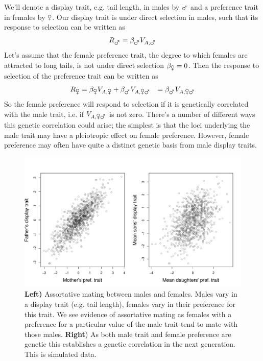 We'll denote a display trait, e.g. tail length, in males by $\mars$ and a preference
trait in females by $\venus$. Our display trait is under direct selection in males, such that its response to selection can be written as
\begin{equation}
R_{\mars} = \beta_{\mars} V_{A, \mars}
\end{equation}
Let's assume that the female preference trait, the degree to which
females are attracted to long tails, is not under direct
selection $\beta_{\venus}=0$. Then the response to selection of the
preference trait can be written as
\begin{eqnarray}
R_{\venus} &=\beta_{\venus}V_{A,\venus}  + \beta_{\mars} V_{A, \venus
  \mars}
& = \beta_{\mars} V_{A, \venus  \mars}
\end{eqnarray}
So the female preference will respond to selection if it is
genetically correlated with the male trait, i.e. if $V_{A, \venus
  \mars}$ is not zero. There's a number of different ways this genetic correlation could arise; the
simplest is that the loci underlying the male trait may have a
pleiotropic effect on female preference. However, female preference
may often have quite a distinct genetic basis from male display traits.
\begin{figure}
\begin{center}
\includegraphics[width=\textwidth]{figures/Response_to_sel/Genetic_corr_assort_mating.pdf}
\end{center} \label{fig:assort_mating_2_trait}
\caption{{\bf Left)} Assortative mating between males and
  females. Males vary in a display trait (e.g. tail length), females
  vary in their preference for this trait. We see evidence of
  assortative mating as females with a preference for a particular
  value of the male trait tend to mate with those males. {\bf Right}) As both
  male trait and female preference are genetic this establishes a
  genetic correlation in the next generation. This is simulated data. } \label{fig:assort_mating_2_trait}
\end{figure}

